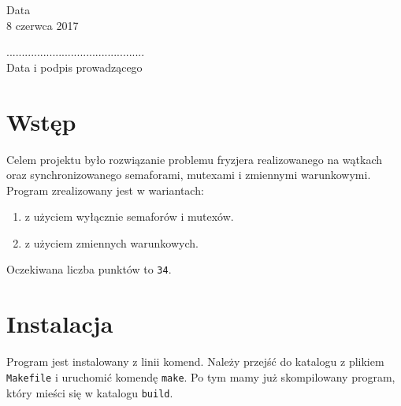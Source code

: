 \documentclass[12pt,a4paper]{article}
\newcommand{\datazajec}{8 czerwca 2017}
\begin{document}
	\begin{minipage}[t]{0.4\linewidth}
		\centering
		Data \\
		\small \datazajec
	\end{minipage}
	
	\begin{flushright}
		\begin{minipage}[t]{0.5\linewidth}
			\centering
			............................................. \\
			\small \textsf{Data i podpis prowadzącego}
		\end{minipage}
	\end{flushright}
	\pagebreak

	\tableofcontents

	\pagebreak

	
	\section{Wstęp}
	Celem projektu było rozwiązanie problemu fryzjera realizowanego na wątkach oraz 
	synchronizowanego semaforami, mutexami i zmiennymi warunkowymi.\\
	Program zrealizowany jest w wariantach:
	\begin{enumerate}[label=\alph*)]
		\item z użyciem wyłącznie semaforów i mutexów.
		\item z użyciem zmiennych warunkowych.
	\end{enumerate}
	Oczekiwana liczba punktów to \texttt{34}.
	
	\section{Instalacja}
	Program jest instalowany z linii komend. Należy przejść do katalogu z plikiem 
	\texttt{Makefile} i uruchomić komendę \texttt{make}. Po tym mamy już skompilowany 
	program, który mieści się w katalogu \texttt{build}.
	
\end{document}
